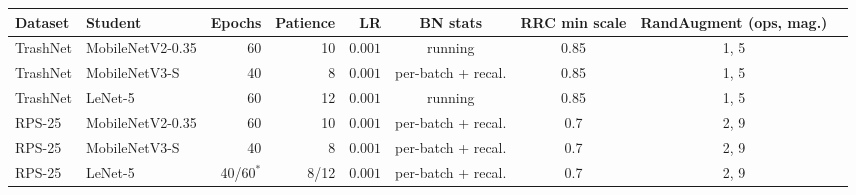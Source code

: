 \begin{tabular}{@{}llrrrcccc@{}}
\toprule
Dataset & Student & Epochs & Patience & LR & BN stats & RRC min scale & RandAugment (ops, mag.) \\
\midrule
TrashNet & MobileNetV2-0.35 & 60 & 10 & $0.001$ & running & 0.85 & 1, 5 \\
TrashNet & MobileNetV3-S & 40 & 8 & $0.001$ & per-batch + recal. & 0.85 & 1, 5 \\
TrashNet & LeNet-5 & 60 & 12 & $0.001$ & running & 0.85 & 1, 5 \\
RPS-25 & MobileNetV2-0.35 & 60 & 10 & $0.001$ & per-batch + recal. & 0.7 & 2, 9 \\
RPS-25 & MobileNetV3-S & 40 & 8 & $0.001$ & per-batch + recal. & 0.7 & 2, 9 \\
RPS-25 & LeNet-5 & 40/60$^{*}$ & 8/12 & $0.001$ & per-batch + recal. & 0.7 & 2, 9 \\
\bottomrule
\end{tabular}
